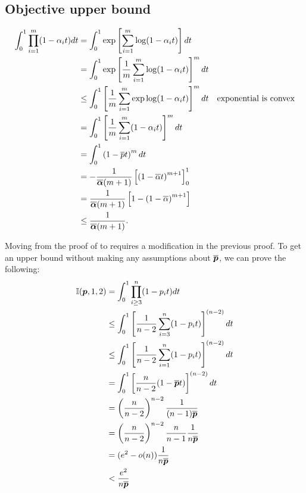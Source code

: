\subsection{Objective upper bound}\label{appendix:integralupperbound}
\integralupperbound*
\begin{align*}
	\int_0^1 \prod_{i=1}^{m}(1-\alpha_i t)dt
	 & = \int_0^1 \exp \left[\sum_{i=1}^{m}\log(1-\alpha_i t)\right]dt                                              \\
	 & = \int_0^1 \exp \left[{\frac{1}{m}}\sum_{i=1}^{m}\log(1-\alpha_i t)\right]^m dt                                     \\
	 & \leq \int_0^1 \left[ {\frac{1}{m}} \sum_{i=1}^{m} \exp\log(1-\alpha_i t)\right]^m dt & \text{exponential is convex} \\
	 & =  \int_0^1 \left[{\frac{1}{m}}  \sum_{i=1}^{m} (1-\alpha_i t)\right]^m dt                                          \\
	 & =  \int_0^1 \left(1-\overline{p} t\right)^m dt                                                                     \\
	 & =  -{\frac{1}{\overline{\bm\alpha}(m+1)}} \left[\left(1-\overline{\alpha}t\right)^{m+1}\right]_0^1                                     \\
	 & =  {\frac{1}{\overline{\bm\alpha}(m+1)}} \left[1-\left(1-\overline{\alpha}\right)^{m+1}\right]                                         \\
	 & \leq {\frac{1}{\overline{\bm\alpha}(m+1)}}.
\end{align*}

Moving from the proof of  to 
requires a modification in the previous proof. To get an upper bound without making
any assumptions about $\overline{{\bm{p}}}$, we can prove the following:
\begin{align*}
	{\mathbb{I}}({\bm{p}}, 1, 2) & = \int_{0}^{1} \prod_{i\geq 3}^{n} (1-{p}_i t)dt                    \\
	               & \leq \int_0^1 \left[{\frac{1}{n-2}}  \sum_{i=3}^{n} (1-{p}_i t)\right]^{(n-2)} dt \\
	               & \leq \int_0^1 \left[{\frac{1}{n-2}}  \sum_{i=1}^{n} (1-{p}_i t)\right]^{(n-2)} dt \\
	               & = \int_0^1 \left[\frac{n}{n-2} (1-\overline{{\bm{p}}} t)\right]^{(n-2)} dt             \\
	               & = \left(\frac{n}{n-2}\right)^{n-2}{\frac{1}{(n-1)\overline{{\bm{p}}}}}                        \\
	               & = \left(\frac{n}{n-2}\right)^{n-2}\frac{n}{n-1}{\frac{1}{n\overline{{\bm{p}}}}}               \\
	               & = (e^2-o(n)){\frac{1}{n\overline{{\bm{p}}}}}                                           \\
                   & < \frac{e^2}{n\overline{{\bm{p}}}}                                           \\
\end{align*}

